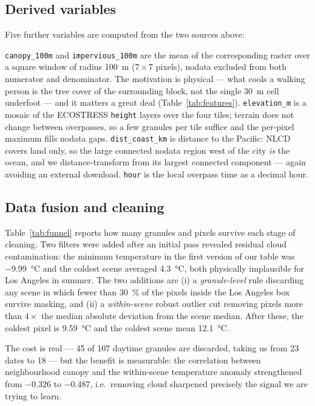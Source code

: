 \documentclass[10pt]{article}   %
\begin{document}
\subsection{Derived variables}
\label{sec:derived}
Five further variables are computed from the two sources above:

\texttt{canopy\_100m} and \texttt{impervious\_100m} are the mean of the corresponding raster
over a square window of radius \SI{100}{\metre} ($7 \times 7$ pixels), nodata excluded from
both numerator and denominator. The motivation is physical --- what cools a walking person is
the tree cover of the surrounding block, not the single \SI{30}{\metre} cell underfoot ---
and it matters a great deal (Table~\ref{tab:features}). \texttt{elevation\_m} is a mosaic of
the ECOSTRESS \texttt{height} layers over the four tiles; terrain does not change between
overpasses, so a few granules per tile suffice and the per-pixel maximum fills nodata gaps.
\texttt{dist\_coast\_km} is distance to the Pacific: NLCD covers land only, so the large
connected nodata region west of the city \emph{is} the ocean, and we distance-transform from
its largest connected component --- again avoiding an external download. \texttt{hour} is the
local overpass time as a decimal hour.

\subsection{Data fusion and cleaning}
\label{sec:fusion}
Table~\ref{tab:funnel} reports how many granules and pixels survive each stage of cleaning.
Two filters were added after an initial pass revealed residual cloud contamination: the
minimum temperature in the first version of our table was \SI{-9.99}{\celsius} and the coldest
scene averaged \SI{4.3}{\celsius}, both physically implausible for Los Angeles in summer. The
two additions are
(i) a \emph{granule-level} rule discarding any scene in which fewer than \SI{30}{\percent} of
the pixels inside the Los Angeles box survive masking, and
(ii) a \emph{within-scene} robust outlier cut removing pixels more than $4 \times$ the median
absolute deviation from the scene median. After these, the coldest pixel is
\SI{9.59}{\celsius} and the coldest scene mean \SI{12.1}{\celsius}.

The cost is real --- 45 of 107 daytime granules are discarded, taking us from 23 dates to 18
--- but the benefit is measurable: the correlation between neighbourhood canopy and the
within-scene temperature anomaly strengthened from $-0.326$ to $-0.487$, i.e.\ removing cloud
sharpened precisely the signal we are trying to learn.
\end{document}
